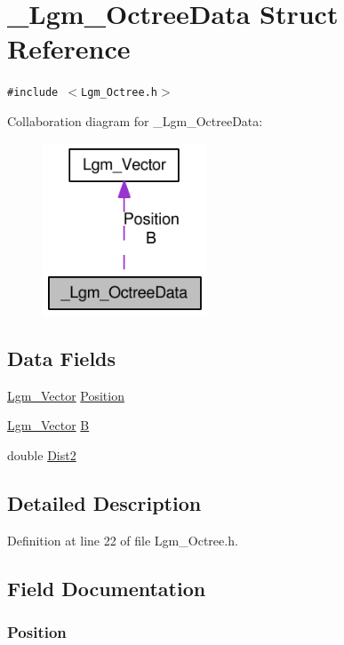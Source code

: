 \hypertarget{struct___lgm___octree_data}{
\section{\_\-Lgm\_\-OctreeData Struct Reference}
\label{struct___lgm___octree_data}
}
{\tt \#include $<$Lgm\_\-Octree.h$>$}

Collaboration diagram for \_\-Lgm\_\-OctreeData:\nopagebreak
\begin{figure}[H]
\begin{center}
\leavevmode
\includegraphics[width=138pt]{struct___lgm___octree_data__coll__graph}
\end{center}
\end{figure}
\subsection*{Data Fields}
\begin{CompactItemize}
\item 
\hyperlink{struct_lgm___vector}{Lgm\_\-Vector} \hyperlink{struct___lgm___octree_data_5dc98779b36676034ccefe5094251c55}{Position}
\item 
\hyperlink{struct_lgm___vector}{Lgm\_\-Vector} \hyperlink{struct___lgm___octree_data_867ec249dee38c139df965aa1611ed2a}{B}
\item 
double \hyperlink{struct___lgm___octree_data_527416adf36035c3ea5799827e7cd8b9}{Dist2}
\end{CompactItemize}


\subsection{Detailed Description}


Definition at line 22 of file Lgm\_\-Octree.h.

\subsection{Field Documentation}
\hypertarget{struct___lgm___octree_data_5dc98779b36676034ccefe5094251c55}{
\subsubsection[{Position}]{ {\bf Position}}}
\label{struct___lgm___octree_data_5dc98779b36676034ccefe5094251c55}





